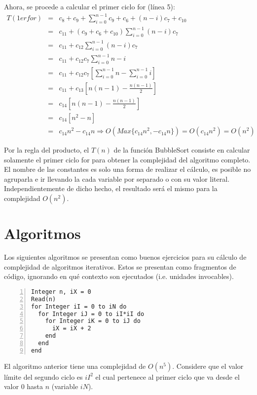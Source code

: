 Ahora, se procede a calcular el primer ciclo for (línea 5):
\begin{eqnarray*}
T(1erfor)&=&c_8 + c_9 + \sum_{i=0}^{n-1}{c_9 + c_6 + (n-i){c_7} + c_{10}}\\
&=&c_{11} + (c_9 + c_6 + c_10)\sum_{i=0}^{n-1}{(n-i)c_7}\\
&=&c_{11} + c_{12}\sum_{i=0}^{n-1}{(n-i)c_7}\\
&=&c_{11} + c_{12}c_7 \sum_{i=0}^{n-1}{n-i}\\
&=&c_{11} + c_{12}c_7 \left[ \sum_{i=0}^{n-1}{n} - \sum_{i=0}^{n-1}{i}\right]\\
&=&c_{11} + c_{13} \left[ n(n-1) - \frac{n(n-1)}{2}\right]\\
&=&c_{14} \left[ n(n-1) - \frac{n(n-1)}{2}\right]\\
&=&c_{14} \left[ n^2-n \right]\\
&=&c_{14}n^2 - c_{14}n \Rightarrow O(Max\{c_{14}n^{2}, -c_{14}n\}) = O(c_{14}n^{2}) = O(n^{2})
\end{eqnarray*}

Por la regla del producto, el $T(n)$ de la función BubbleSort consiste en calcular solamente el primer ciclo for para obtener la complejidad del algoritmo completo. El nombre de las constantes es solo una forma de realizar el cálculo, es posible no agruparla e ir llevando la cada variable por separado o con su valor literal. Independientemente de dicho hecho, el resultado será el mismo para la complejidad $O(n^{2})$.

\section{Algoritmos}

Los siguientes algoritmos se presentan como buenos ejercicios para su cálculo de complejidad de algoritmos iterativos. Estos se presentan como fragmentos de código, ignorando en qué contexto son ejecutados (i.e. unidades invocables).

\begin{lstlisting}[upquote=true, language=pseudo, numbers=left]
Integer n, iX = 0
Read(n)
for Integer iI = 0 to iN do
  for Integer iJ = 0 to iI*iI do
    for Integer iK = 0 to iJ do
      iX = iX + 2
    end
  end
end
\end{lstlisting}

El algoritmo anterior tiene una complejidad de $O(n^{5})$. Considere que el valor límite del segundo ciclo es $iI^{2}$ el cual pertenece al primer ciclo que va desde el valor $0$ hasta $n$ (variable $iN$).

